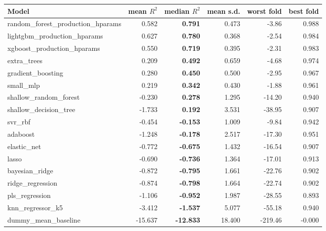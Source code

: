\begin{tabular}{lrrrrr}
\toprule
Model & mean $R^2$ & median $R^2$ & mean s.d. & worst fold & best fold \\
\midrule
random\_forest\_production\_hparams & 0.582 & \textbf{0.791} & 0.473 & -3.86 & 0.988 \\
lightgbm\_production\_hparams & 0.627 & \textbf{0.780} & 0.368 & -2.54 & 0.984 \\
xgboost\_production\_hparams & 0.550 & \textbf{0.719} & 0.395 & -2.31 & 0.983 \\
extra\_trees & 0.209 & \textbf{0.492} & 0.659 & -4.68 & 0.974 \\
gradient\_boosting & 0.280 & \textbf{0.450} & 0.500 & -2.95 & 0.967 \\
small\_mlp & 0.219 & \textbf{0.342} & 0.430 & -1.88 & 0.961 \\
shallow\_random\_forest & -0.230 & \textbf{0.278} & 1.295 & -14.20 & 0.940 \\
shallow\_decision\_tree & -1.733 & \textbf{0.192} & 3.531 & -38.95 & 0.907 \\
svr\_rbf & -0.454 & \textbf{-0.153} & 1.009 & -9.84 & 0.942 \\
adaboost & -1.248 & \textbf{-0.178} & 2.517 & -17.30 & 0.951 \\
elastic\_net & -0.772 & \textbf{-0.675} & 1.432 & -16.54 & 0.907 \\
lasso & -0.690 & \textbf{-0.736} & 1.364 & -17.01 & 0.913 \\
bayesian\_ridge & -0.872 & \textbf{-0.795} & 1.661 & -22.76 & 0.902 \\
ridge\_regression & -0.874 & \textbf{-0.798} & 1.664 & -22.74 & 0.902 \\
pls\_regression & -1.106 & \textbf{-0.952} & 1.987 & -28.55 & 0.893 \\
knn\_regressor\_k5 & -3.412 & \textbf{-1.537} & 5.077 & -55.18 & 0.940 \\
dummy\_mean\_baseline & -15.637 & \textbf{-12.833} & 18.400 & -219.46 & -0.000 \\
\bottomrule
\end{tabular}